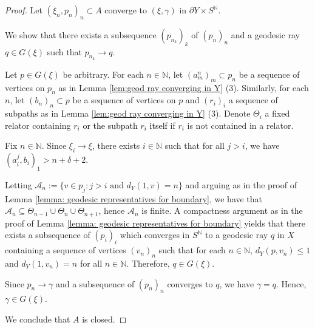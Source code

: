 \documentclass[10pt,a4paper]{amsart}
\newcommand{\N}{\mathbb{N}}
\begin{document}
\begin{proof}

Let $(\xi_n, p_n)_n \subset A$ converge to $(\xi, \gamma) $ in $\partial Y \times S^{\N}$. 

    We show that there exists a subsequence $(p_{n_k})_k$ of $(p_n)_n$ and a geodesic ray $q \in G(\xi)$ such that $p_{n_k} \to q$.

    Let $p \in G(\xi)$ be arbitrary. For each $n \in \N$, let $(a_m^n)_m \subset p_n$ be a sequence of vertices on $p_n$ as in Lemma \ref{lem:geod ray converging in Y} (3). Similarly, for each $n$, let $(b_n)_n \subset p$ be a sequence of vertices on $p$ and $(r_i)_i$ a sequence of subpaths as in Lemma \ref{lem:geod ray converging in Y} (3). Denote $\Theta_i$ a fixed relator containing \textcolor{black}{$r_i$ or the subpath $r_i$ itself} if $r_i$ is not contained in a relator. 
    
    Fix $n \in \N$. Since $\xi_i \to \xi$, there exists $i \in \N$ such that for all $j > i$, we have $(a_i^j, b_i)_1 > n + \delta + 2$. 

    Letting $\mathcal{A}_n := \{v \in p_j : j > i \text{ and } d_Y(1,v) = n\}$ and arguing as in the proof of Lemma \ref{lemma: geodesic representatives for boundary}, we have that $\mathcal{A}_n \subseteq \Theta_{n-1} \cup \Theta_n \cup \Theta_{n+1}$, hence $\mathcal{A}_n$ is finite. A compactness argument as in the proof of Lemma \ref{lemma: geodesic representatives for boundary} yields that there exists a subsequence of $(p_i)_i$ which converges in $S^{\N}$ to a geodesic ray $q$ in $X$ containing a sequence of vertices $(v_n)_n$ such that for each $n \in \N$, $d_Y(p,v_n) \leq 1$ and $d_Y(1,v_n) = n$ for all $n \in \N$. Therefore, $q \in G(\xi)$. 

    Since $p_n \to \gamma$ and a subsequence of $(p_n)_n$ converges to $q$, we have $\gamma = q$. Hence, $\gamma \in G(\xi)$. 

    We conclude that $A$ is closed. 
    
\end{proof}
\end{document}
